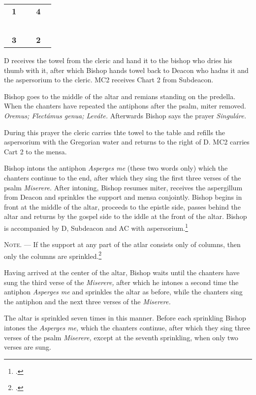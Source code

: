 \documentclass[letterpaper]{report}
\newcommand\crossplan{
\begin{center}
    \begin{tabular}{ | l c r | }
       \hline
       \cross\ \textbf{1} &                    & \textbf{4} \cross\ \\
                          &       \cross\      &                    \\
       \cross\ \textbf{3} &                    & \textbf{2} \cross\ \\
       \hline
   \end{tabular} 
\end{center}
}
\begin{document}
{\crossplan

D receives the towel from the cleric and hand it to the bishop who dries his
thumb with it, after which Bishop hands towel back to Deacon who hadns it and the
aspersorium to the cleric. MC2 receives Chart 2 from Subdeacon.

\rubric Bishop goes to the middle of the altar and remians standing on the predella.
When the chanters have repeated the antiphons after the psalm, miter removed.
\textit{Oremus; Flectámus genua; Leváte.} Afterwards Bishop says the prayer
\textit{Singuláre.}

During this prayer the cleric carries thte towel to the table and refills the
aspersorium with the Gregorian water and returns to the right of D. MC2 carries
Cart 2 to the mensa.

\rubric Bishop intons the antiphon \textit{Asperges me} (these two words only) which
the chanters continue to the end, after which they sing the first three verses
of the psalm \textit{Miserere.} After intoning, Bishop resumes miter, receives the
aspergillum from Deacon and sprinkles the support and mensa conjointly. Bishop begins in
front at the middle of the altar, proceeds to the epistle side, passes behind
the altar and returns by the gospel side to the iddle at the front of the
altar. Bishop is accompanied by D, Subdeacon and AC with aspersorium.\footcite[If the back
part of the altar is attached to the wall, so that the bishop cannot go around
it, he sprinkles only the \textit{base} of the base of the altar when passing
from the middle to the epistle corner, then the epistle side of the altar,
afterwards the table of the altar from the epistle corner to the gospel corner,
then the gospel side of the altar and finaly the \textit{base} in front of the
altar from the gospel corner to the middle.][footnote, p. 68.]{consecranda}

\textsc{Note. ---} If the support at any part of the atlar consists only of
columns, then only the columns are sprinkled.\footcite[][p. 68.]{consecranda}

\rubric Having arrived at the center of the altar, Bishop waits until the chanters
have sung the third verse of the \textit{Miserere,} after which he intones a
second time the antiphon \textit{Asperges me} and sprinkles the altar as
before, while the chanters sing the antiphon and the next three verses of the
\textit{Miserere.}

\rubric The altar is sprinkled seven times in this manner. Before each
sprinkling Bishop intones the \textit{Asperges me,} which the chanters continue,
after which they sing three verses of the psalm \textit{Miserere,} except at
the seventh sprinkling, when only two verses are sung.

}
\end{document}
